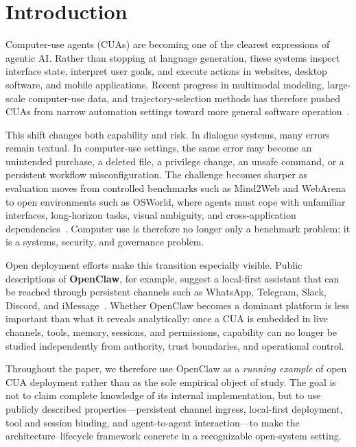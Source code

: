 \section{Introduction}
\label{sec:intro}

Computer-use agents (CUAs) are becoming one of the clearest expressions of agentic AI. Rather than stopping at language generation, these systems inspect interface state, interpret user goals, and execute actions in websites, desktop software, and mobile applications. Recent progress in multimodal modeling, large-scale computer-use data, and trajectory-selection methods has therefore pushed CUAs from narrow automation settings toward more general software operation~\cite{wang2025opencua,gonzalez2025scalingcua}.

This shift changes both capability and risk. In dialogue systems, many errors remain textual. In computer-use settings, the same error may become an unintended purchase, a deleted file, a privilege change, an unsafe command, or a persistent workflow misconfiguration. The challenge becomes sharper as evaluation moves from controlled benchmarks such as Mind2Web and WebArena to open environments such as OSWorld, where agents must cope with unfamiliar interfaces, long-horizon tasks, visual ambiguity, and cross-application dependencies~\cite{deng2023mind2web,zhou2023webarena,xie2024osworld}. Computer use is therefore no longer only a benchmark problem; it is a systems, security, and governance problem.

Open deployment efforts make this transition especially visible. Public descriptions of \textbf{OpenClaw}, for example, suggest a local-first assistant that can be reached through persistent channels such as WhatsApp, Telegram, Slack, Discord, and iMessage~\cite{openclaw2026website,ibm2026openclaw}. Whether OpenClaw becomes a dominant platform is less important than what it reveals analytically: once a CUA is embedded in live channels, tools, memory, sessions, and permissions, capability can no longer be studied independently from authority, trust boundaries, and operational control.

Throughout the paper, we therefore use OpenClaw as a \emph{running example} of open CUA deployment rather than as the sole empirical object of study. The goal is not to claim complete knowledge of its internal implementation, but to use publicly described properties---persistent channel ingress, local-first deployment, tool and session binding, and agent-to-agent interaction---to make the architecture--lifecycle framework concrete in a recognizable open-system setting.


